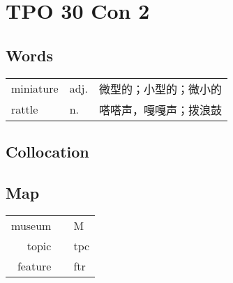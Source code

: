 \section{TPO 30 Con 2}

\subsection{Words}

\begin{tabular}{lll}
    miniature & adj. & 微型的；小型的；微小的 \\
    rattle    & n.   & 嗒嗒声，嘎嘎声；拨浪鼓 \\
\end{tabular}

\subsection{Collocation}

\subsection{Map}

\begin{tabular}{rc@{\quad$\to$\quad}l}
    museum  &  & \textcircled{M} \\
    topic   &  & tpc             \\
    feature &  & ftr             \\
\end{tabular}
